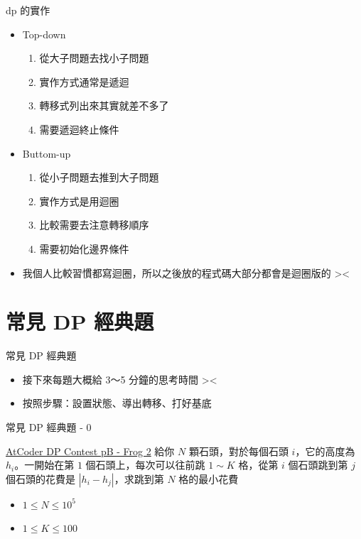 \documentclass[aspectratio=169]{beamer}
\begin{document}
    \begin{frame}{dp 的實作}
        \begin{itemize}
            \item Top-down
            \begin{enumerate}
                \item 從大子問題去找小子問題
                \item 實作方式通常是遞迴
                \item 轉移式列出來其實就差不多了
                \item 需要遞迴終止條件

            \end{enumerate}
            \item Buttom-up
            \begin{enumerate}
                \item 從小子問題去推到大子問題
                \item 實作方式是用迴圈
                \item 比較需要去注意轉移順序
                \item 需要初始化邊界條件
            \end{enumerate}
            \item 我個人比較習慣都寫迴圈，所以之後放的程式碼大部分都會是迴圈版的 ><
        \end{itemize}
    \end{frame}

    \section{常見 DP 經典題}

    \begin{frame}{常見 DP 經典題}
        \begin{itemize}
            \item 接下來每題大概給 3～5 分鐘的思考時間 ><
            \item 按照步驟：設置狀態、導出轉移、打好基底
        \end{itemize}
    \end{frame}

    \begin{frame}{常見 DP 經典題 - 0}
        \begin{block}{\href{https://atcoder.jp/contests/dp/tasks/dp_b}{AtCoder DP Contest pB - Frog 2}}
            給你 $N$ 顆石頭，對於每個石頭 $i$，它的高度為 $h_i$。一開始在第 $1$ 個石頭上，每次可以往前跳 $1 \sim K$ 格，從第 $i$ 個石頭跳到第 $j$ 個石頭的花費是 $|h_i - h_j|$，求跳到第 $N$ 格的最小花費 \\
            \vspace{2.5mm}
            \begin{itemize}
                \item $1 \le N \le 10^5$
                \item $1 \le K \le 100$
            \end{itemize}
        \end{block}
    \end{frame}
\end{document}
